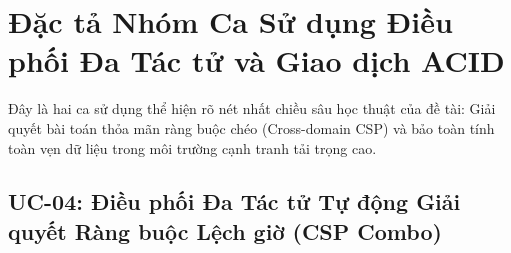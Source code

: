 \section{Đặc tả Nhóm Ca Sử dụng Điều phối Đa Tác tử và Giao dịch ACID}
\label{sec:dacta_dieuphoi_giaodich}

Đây là hai ca sử dụng thể hiện rõ nét nhất chiều sâu học thuật của đề tài: Giải quyết bài toán thỏa mãn ràng buộc chéo (Cross-domain CSP) và bảo toàn tính toàn vẹn dữ liệu trong môi trường cạnh tranh tải trọng cao.

\subsection{UC-04: Điều phối Đa Tác tử Tự động Giải quyết Ràng buộc Lệch giờ (CSP Combo)}
\label{subsec:spec_uc04}


